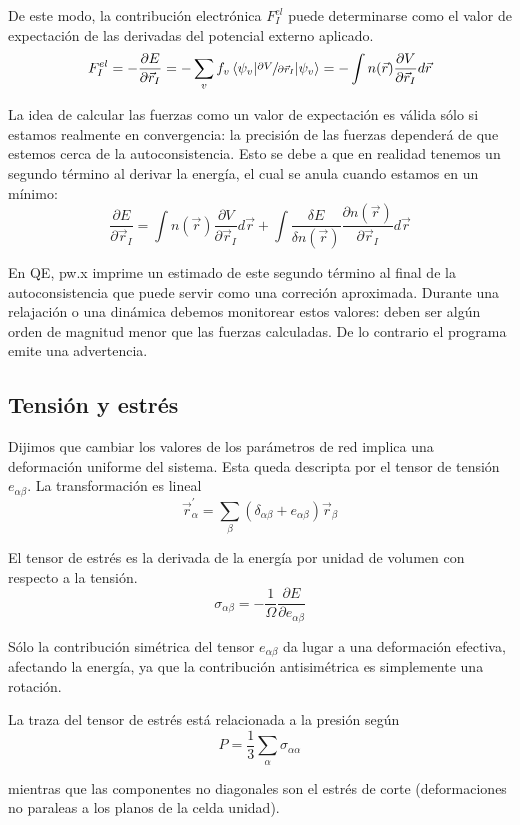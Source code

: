   De este modo, la contribución electrónica $F_I^{el}$ puede determinarse como el valor de expectación de las derivadas del potencial externo aplicado.
    $$F_I^{el} = - \frac{\partial E}{\partial \vec{r}_I} = - \sum_v f_v \expval{\sfrac{\partial V}{\partial \vec{r}_I}}{\psi_v} = - \int n(\vec{r}) \frac{\partial V}{\partial \vec{r}_I} d \vec{r}$$

  La idea de calcular las fuerzas como un valor de expectación es válida sólo si estamos realmente en convergencia: la precisión de las fuerzas dependerá de que estemos cerca de la autoconsistencia. Esto se debe a que en realidad tenemos un segundo término al derivar la energía, el cual se anula cuando estamos en un mínimo:
    $$\frac{\partial E}{\partial \vec{r}_I} = \int n(\vec{r}) \frac{\partial V}{\partial \vec{r}_I} d \vec{r} + \int \frac{\delta E}{\delta n(\vec{r})} \frac{\partial n (\vec{r})}{\partial \vec{r}_I} d \vec{r}$$

  En QE, pw.x imprime un estimado de este segundo término al final de la autoconsistencia que puede servir como una correción aproximada. Durante una relajación o una dinámica debemos monitorear estos valores: deben ser algún orden de magnitud menor que las fuerzas calculadas. De lo contrario el programa emite una advertencia.

\subsection{Tensión y estrés}

  Dijimos que cambiar los valores de los parámetros de red implica una deformación uniforme del sistema. Esta queda descripta por el tensor de tensión $e_{\alpha \beta}$. La transformación es lineal
    $$\vec{r}_{\alpha}^{'} = \sum_{\beta} (\delta_{\alpha \beta} + e_{\alpha \beta}) \vec{r}_{\beta}$$

  El tensor de estrés es la derivada de la energía por unidad de volumen con respecto a la tensión.
    $$\sigma_{\alpha \beta} = -\frac{1}{\Omega} \frac{\partial E}{\partial e_{\alpha \beta}}$$

  Sólo la contribución simétrica del tensor $e_{\alpha \beta}$ da lugar a una deformación efectiva, afectando la energía, ya que la contribución antisimétrica es simplemente una rotación.

  La traza del tensor de estrés está relacionada a la presión según
    $$P = \frac{1}{3} \sum_{\alpha} \sigma_{\alpha \alpha} $$

  mientras que las componentes no diagonales son el estrés de corte (deformaciones no paraleas a los planos de la celda unidad).

